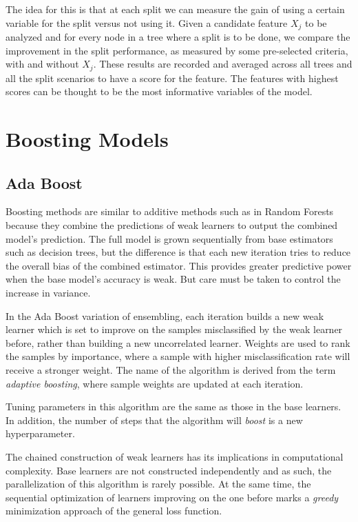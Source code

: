 The idea for this is that at each split we can measure the gain of using a certain variable for the split versus not using it. Given a candidate feature $X_j$ to be analyzed and for every node in a tree where a split is to be done, we compare the improvement in the split performance, as measured by some pre-selected criteria, with and without $X_j$. These results are recorded and averaged across all trees and all the split scenarios to have a score for the feature. The features with highest scores can be thought to be the most informative variables of the model.


\section{Boosting Models}\label{section-boosting}
\subsection{Ada Boost}
\textcite{schapire-adaBoost}

Boosting methods are similar to additive methods such as in Random Forests because they combine the predictions of weak learners to output the combined model's prediction. The full model is grown sequentially from base estimators such as decision trees, but the difference is that each new iteration tries to reduce the overall bias of the combined estimator. This provides greater predictive power when the base model's accuracy is weak. But care must be taken to control the increase in variance.

In the Ada Boost variation of ensembling, each iteration builds a new weak learner which is set to improve on the samples misclassified by the weak learner before, rather than building a new uncorrelated learner. Weights are used to rank the samples by importance, where a sample with higher misclassification rate will receive a stronger weight. The name of the algorithm is derived from the term \textit{adaptive boosting}, where sample weights are updated at each iteration.

Tuning parameters in this algorithm are the same as those in the base learners. In addition, the number of steps that the algorithm will \textit{boost} is a new hyperparameter.

The chained construction of weak learners has its implications in computational complexity. Base learners are not constructed independently and as such, the parallelization of this algorithm is rarely possible. At the same time, the sequential optimization of learners improving on the one before marks a \textit{greedy} minimization approach of the general loss function.

